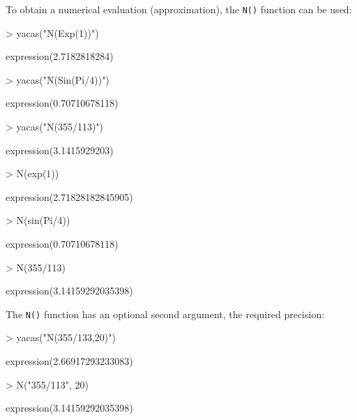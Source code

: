 \documentclass[]{article}
\newcommand{\code}[1]{{\tt #1}}
\begin{document}
 To obtain a numerical evaluation
(approximation), the \code{N()} function can be used:
\begin{Schunk}
\begin{Sinput}
> yacas("N(Exp(1))")
\end{Sinput}
\begin{Soutput}
expression(2.7182818284)
\end{Soutput}
\begin{Sinput}
> yacas("N(Sin(Pi/4))")
\end{Sinput}
\begin{Soutput}
expression(0.70710678118)
\end{Soutput}
\begin{Sinput}
> yacas("N(355/113)")
\end{Sinput}
\begin{Soutput}
expression(3.1415929203)
\end{Soutput}
\end{Schunk}

\begin{Schunk}
\begin{Sinput}
> N(exp(1))
\end{Sinput}
\begin{Soutput}
expression(2.71828182845905)
\end{Soutput}
\begin{Sinput}
> N(sin(Pi/4))
\end{Sinput}
\begin{Soutput}
expression(0.70710678118)
\end{Soutput}
\begin{Sinput}
> N(355/113)
\end{Sinput}
\begin{Soutput}
expression(3.14159292035398)
\end{Soutput}
\end{Schunk}

The \code{N()} function has an optional second argument, the required precision:
\begin{Schunk}
\begin{Sinput}
> yacas("N(355/133,20)")
\end{Sinput}
\begin{Soutput}
expression(2.66917293233083)
\end{Soutput}
\end{Schunk}

\begin{Schunk}
\begin{Sinput}
> N("355/113", 20)
\end{Sinput}
\begin{Soutput}
expression(3.14159292035398)
\end{Soutput}
\end{Schunk}
\end{document}

